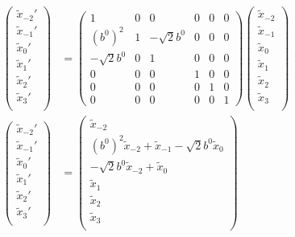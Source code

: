 \documentclass[aps,reprint,notitlepage,nofootinbib,superscriptaddress]{revtex4-1}
\begin{document}
\begin{align}
    \begin{pmatrix}
    \tilde{x}_{-2}'\\
    \tilde{x}_{-1}'\\
    \tilde{x}_{0}'\\
    \tilde{x}_{1}'\\
    \tilde{x}_{2}'\\
    \tilde{x}_{3}'\\
    \end{pmatrix}&=\begin{pmatrix}
    1&0&0&0&0&0\\
    (b^0)^2&1&-\sqrt{2}b^0&0&0&0\\
    -\sqrt{2}b^0&0&1&0&0&0\\
    0&0&0&1&0&0\\
    0&0&0&0&1&0\\
    0&0&0&0&0&1
    \end{pmatrix}\begin{pmatrix}
    \tilde{x}_{-2}\\
    \tilde{x}_{-1}\\
    \tilde{x}_{0}\\
    \tilde{x}_{1}\\
    \tilde{x}_{2}\\
    \tilde{x}_{3}\\
    \end{pmatrix}\\
    \begin{pmatrix}
    \tilde{x}_{-2}'\\
    \tilde{x}_{-1}'\\
    \tilde{x}_{0}'\\
    \tilde{x}_{1}'\\
    \tilde{x}_{2}'\\
    \tilde{x}_{3}'\\
    \end{pmatrix}&=\begin{pmatrix}
    \tilde{x}_{-2}\\
    (b^0)^2\tilde{x}_{-2}+\tilde{x}_{-1}-\sqrt{2}b^0\tilde{x}_{0}\\
    -\sqrt{2}b^0\tilde{x}_{-2}+\tilde{x}_{0}\\
    \tilde{x}_{1}\\
    \tilde{x}_{2}\\
    \tilde{x}_{3}\\
    \end{pmatrix}\\
\end{align}
\end{document}
